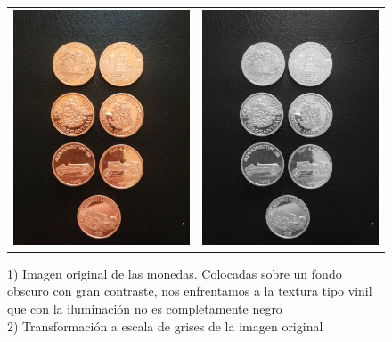 	\begin{figure}[!h]
		\centering
		\begin{tabular}{cc}
			\includegraphics[width=7.5cm]{Imagenes/monedas_2_chica.jpeg} & \includegraphics[width=7.5cm]{Imagenes/op_morf_monedas_0.jpeg}
		\end{tabular}
		\caption{1) Imagen original de las monedas. Colocadas sobre un fondo obscuro con gran contraste, nos enfrentamos a la textura tipo vinil que con la iluminación no es completamente negro \\ 2) Transformación a escala de grises de la imagen original}
	\end{figure}

	\newpage

